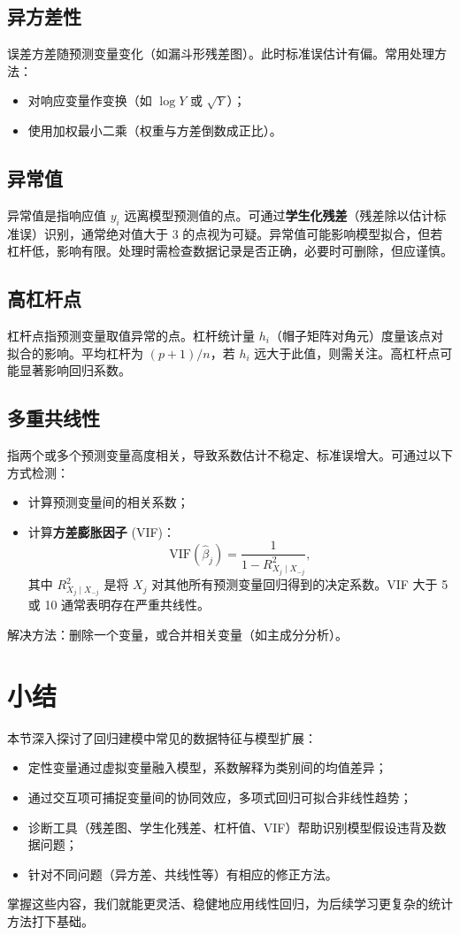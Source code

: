 \documentclass[UTF8]{ctexart}
\numberwithin{equation}{section}
\begin{document}
\subsection{异方差性}
误差方差随预测变量变化（如漏斗形残差图）。此时标准误估计有偏。常用处理方法：
\begin{itemize}
    \item 对响应变量作变换（如 \(\log Y\) 或 \(\sqrt{Y}\)）；
    \item 使用加权最小二乘（权重与方差倒数成正比）。
\end{itemize}

\subsection{异常值}
异常值是指响应值 \(y_i\) 远离模型预测值的点。可通过\textbf{学生化残差}（残差除以估计标准误）识别，通常绝对值大于 3 的点视为可疑。异常值可能影响模型拟合，但若杠杆低，影响有限。处理时需检查数据记录是否正确，必要时可删除，但应谨慎。

\subsection{高杠杆点}
杠杆点指预测变量取值异常的点。杠杆统计量 \(h_i\)（帽子矩阵对角元）度量该点对拟合的影响。平均杠杆为 \((p+1)/n\)，若 \(h_i\) 远大于此值，则需关注。高杠杆点可能显著影响回归系数。

\subsection{多重共线性}
指两个或多个预测变量高度相关，导致系数估计不稳定、标准误增大。可通过以下方式检测：
\begin{itemize}
    \item 计算预测变量间的相关系数；
    \item 计算\textbf{方差膨胀因子} (VIF)：
    \[
    \mathrm{VIF}(\hat{\beta}_j) = \frac{1}{1 - R_{X_j \mid X_{-j}}^2},
    \]
    其中 \(R_{X_j \mid X_{-j}}^2\) 是将 \(X_j\) 对其他所有预测变量回归得到的决定系数。VIF 大于 5 或 10 通常表明存在严重共线性。
\end{itemize}
解决方法：删除一个变量，或合并相关变量（如主成分分析）。

\section{小结}
本节深入探讨了回归建模中常见的数据特征与模型扩展：
\begin{itemize}
    \item 定性变量通过虚拟变量融入模型，系数解释为类别间的均值差异；
    \item 通过交互项可捕捉变量间的协同效应，多项式回归可拟合非线性趋势；
    \item 诊断工具（残差图、学生化残差、杠杆值、VIF）帮助识别模型假设违背及数据问题；
    \item 针对不同问题（异方差、共线性等）有相应的修正方法。
\end{itemize}
掌握这些内容，我们就能更灵活、稳健地应用线性回归，为后续学习更复杂的统计方法打下基础。
\end{document}
